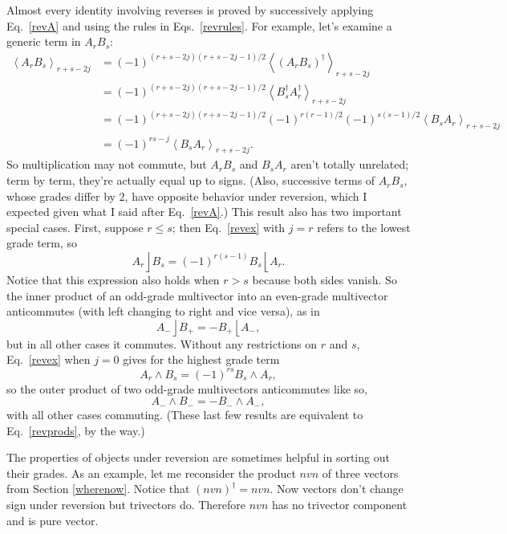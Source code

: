 \documentclass{utarticle}
\DeclareMathOperator{\lin}{\rfloor}
\DeclareMathOperator{\rin}{\lfloor}
\DeclareMathOperator{\out}{\wedge}
\newcommand{\rev}[1]{\ensuremath{#1^\dagger}}
\newcommand{\grade}[2][]{\ensuremath{\left\langle #2 \right\rangle_{#1}}}
\begin{document}
Almost every identity involving reverses is proved by successively
applying Eq.~\eqref{revA} and using the rules in Eqs.~\eqref{revrules}.  
For example, let's examine a generic term in $A_r B_s$:
\begin{align}
\grade[r+s-2j]{A_r B_s} & = (-1)^{(r+s-2j)(r+s-2j-1)/2} 
                            \grade[r+s-2j]{\rev{(A_r B_s)}} \nonumber \\
 & = (-1)^{(r+s-2j)(r+s-2j-1)/2} \grade[r+s-2j]{\rev{B_s} \rev{A_r}} 
     \nonumber \\
 & = (-1)^{(r+s-2j)(r+s-2j-1)/2}(-1)^{r(r-1)/2}(-1)^{s(s-1)/2} 
     \grade[r+s-2j]{B_s A_r} \nonumber \\
 & = (-1)^{rs-j} \grade[r+s-2j]{B_s A_r}.
\label{revex}
\end{align}
So multiplication may not commute, but $A_r B_s$ and $B_s A_r$ aren't 
totally unrelated; term by term, they're actually equal up to signs.  (Also, 
successive terms of $A_r B_s$, whose grades differ by $2$, have opposite 
behavior under reversion, which I expected given what I said after Eq.~\eqref{revA}.)
This result also has two important special cases.  First, suppose $r \leq s$; 
then Eq.~\eqref{revex} with $j=r$ refers to the lowest grade term, so
\begin{equation} 
A_r \lin B_s = (-1)^{r(s-1)} B_s \rin A_r.
\label{commuteinner}
\end{equation} 
Notice that this expression also holds when $r > s$ because both sides 
vanish.  So the inner product of an odd-grade multivector into an even-grade
multivector anticommutes (with left changing to right and vice 
versa), as in
\begin{equation} A_- \lin B_+ = -B_+ \rin A_-, \end{equation}
but in all other cases it commutes.  Without any restrictions on $r$ and $s$, 
Eq.~\eqref{revex} when $j=0$ gives for the highest grade term
\begin{equation} 
A_r \out B_s = (-1)^{rs} B_s \out A_r, 
\label{commuteouter}
\end{equation}
so the outer product of two odd-grade multivectors anticommutes like so,
\begin{equation} A_- \out B_- = -B_- \out A_-, \end{equation}
with all other cases commuting.  (These last few results are equivalent to 
Eq.~\eqref{revprods}, by the way.)

The properties of objects under reversion are sometimes helpful in sorting out 
their grades.  As an example, let me reconsider the product $n v n$ of three vectors
from Section \ref{wherenow}.  Notice that $\rev{(n v n)} = n v n$.  Now vectors don't 
change sign under reversion but trivectors do.  Therefore $n v n$ has no trivector
component and is pure vector.   
\end{document}
